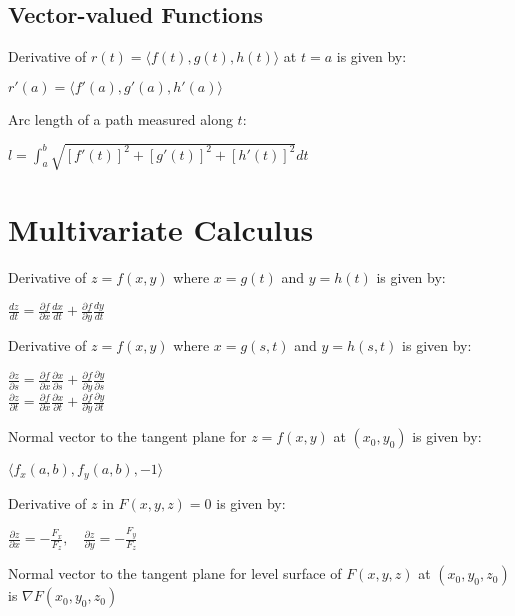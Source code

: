 \documentclass[12pt, a4paper]{article}
\begin{document}
\begin{multicols*}{4}
\subsection{Vector-valued Functions}
Derivative of $r(t) = \langle f(t), g(t), h(t)\rangle$ at $t=a$ is given by:\\
{\centering
  $r'(a) = \langle f'(a), g'(a), h'(a)\rangle$
\par}

Arc length of a path measured along $t$:\\
{\centering
  $l = \int^b_a \sqrt{[f'(t)]^2 + [g'(t)]^2 + [h'(t)]^2}dt$
\par}
\colbreak

\section{Multivariate Calculus}
Derivative of $z=f(x,y)$ where $x=g(t)$ and $y=h(t)$ is given by:\\
{\centering
  $\displaystyle \frac{dz}{dt} = \frac{\partial f}{\partial x}\frac{dx}{dt} + \frac{\partial f}{\partial y} \frac{dy}{dt}$
\par}

Derivative of $z=f(x,y)$ where $x=g(s,t)$ and $y=h(s,t)$ is given by:\\
{\centering
  $\displaystyle \frac{\partial z}{\partial s} = \frac{\partial f}{\partial x}\frac{\partial x}{\partial s} + \frac{\partial f}{\partial y} \frac{\partial y}{\partial s}$\\
  $\displaystyle \frac{\partial z}{\partial t} = \frac{\partial f}{\partial x}\frac{\partial x}{\partial t} + \frac{\partial f}{\partial y} \frac{\partial y}{\partial t}$
\par}

Normal vector to the tangent plane for $z=f(x,y)$ at $(x_0,y_0)$ is given by:\\
{\centering
  $\langle f_x(a,b), f_y(a,b), -1 \rangle$
\par}

Derivative of $z$ in $F(x,y,z) = 0$ is given by:\\
{\centering
  $\displaystyle \frac{\partial z}{\partial x} = -\frac{F_x}{F_z},\quad\frac{\partial z}{\partial y} = -\frac{F_y}{F_z}$
\par}

Normal vector to the tangent plane for level surface of $F(x,y,z)$ at $(x_0,y_0,z_0)$ is $\nabla F(x_0,y_0,z_0)$


\end{multicols*}
\end{document}
